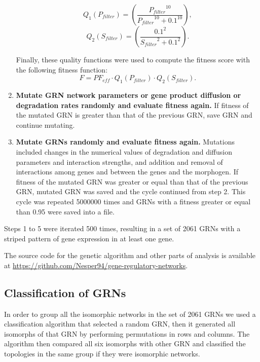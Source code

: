 \documentclass[10pt,letterpaper]{article}
\begin{document}
\begin{enumerate}
 \begin{equation}
  Q_1(P_{filter}) = \left( \frac{ {P_{filter}}^{10} }{ {P_{filter}}^{10} +
  0.1^{10} } \right),
 \end{equation}
 \begin{equation}
  Q_2(S_{filter}) = \left( \frac{ 0.1^2 }{ {S_{filter}}^2 + 0.1^2 } \right).
 \end{equation}

 Finally, these quality functions were used to compute the fitness score with
 the following fitness function:
 \begin{equation}
  F = \mathit{PF_{eff}} \cdot Q_1(P_{filter}) \cdot Q_2(S_{filter}).
 \end{equation}

 \item{\bf Mutate GRN network parameters or gene product diffusion or
degradation rates randomly and evaluate fitness again.} If fitness of the
mutated GRN is greater than that of the previous GRN, save GRN and continue
mutating.

 \item {\bf Mutate GRNs randomly and evaluate fitness again.} Mutations
included changes in the  numerical values of degradation and diffusion
parameters and interaction strengths, and addition and removal of interactions
among genes and between the genes and the morphogen. If fitness of the mutated
GRN was greater or equal than that of the previous GRN, mutated GRN was saved
and the cycle continued from step 2. This cycle was repeated 5000000 times and
GRNs with a fitness greater or equal than 0.95 were saved into a file.

\end{enumerate}

Steps 1 to 5 were iterated 500 times, resulting in a set of 2061 GRNs with a
striped pattern of gene expression in at least one gene.

The source code for the genetic algorithm and other parts of analysis is available at
\url{https://github.com/Nesper94/gene-regulatory-networks}.

\subsection*{Classification of GRNs}

In order to group all the isomorphic networks in the set of 2061 GRNs we used a
classification algorithm that selected a random GRN, then it generated all
isomorphs of that GRN by performing permutations in rows and columns. The
algorithm then compared all six isomorphs with other GRN and classified the
topologies in the same group if they were isomorphic networks.
\end{document}
